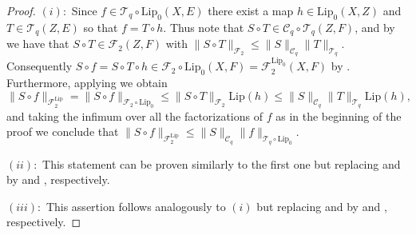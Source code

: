 \documentclass[12pt]{amsart}
\def\F{\mathcal{F}}
\def\C{\mathcal{C}}
\def\T{\mathcal{T}}
\def\C{\mathcal{C}}
\def\Lip{\mathrm{Lip}_0}
\def\Lipnorm{\mathrm{Lip}}
\begin{document}
\begin{proof}
	$(i):$ Since $f \in \T_q\circ\Lip(X,E)$ there exist a map $h\in\Lip(X,Z)$ and $T\in \T_q(Z,E)$ so that $f = T \circ h$. Thus note that $S\circ T \in \C_q \circ \T_q(Z,F)$, and by \cite[21.4.6]{Pie-80} we have that $S \circ T \in \F_2(Z,F)$ with $\|S \circ T\|_{\F_2} \leq \|S\|_{\C_q}\|T\|_{\T_q}$. Consequently $S \circ f = S \circ T \circ h \in \F_2 \circ \Lip(X,F) = \F_2^{\Lip}(X,F)$ by \cite[Proposition 2.9]{AchTia-24}. Furthermore, applying \cite[p. 828]{Saa-17} we obtain
	$$
	\|S\circ f\|_{\F_2^{\Lipnorm}} = \|S \circ f\|_{\F_2 \circ \Lip} \leq \|S \circ T\|_{\F_2}\Lipnorm(h) \leq \|S\|_{\C_q}\|T\|_{\T_q}\Lipnorm(h),
	$$
	and taking the infimum over all the factorizations of $f$ as in the beginning of the proof we conclude that $\|S \circ f\|_{\F_2^{\Lipnorm}} \leq \|S\|_{\C_q}\|f\|_{\T_q\circ \Lip}$.
	
	$(ii):$ This statement can be proven similarly to the first one but replacing \cite[21.4.6]{Pie-80} and \cite[p. 828]{Saa-17} by \cite[21.4.8]{Pie-80} and \cite[Proposition 4.5 $(i)$ and Proposition 4.8]{BelChe-18}, respectively.

	$(iii):$ This assertion follows analogously to $(i)$ but replacing \cite[21.4.6]{Pie-80} and \cite[p. 828]{Saa-17} by \cite[21.4.7]{Pie-80} and \cite[Remark 2.7]{AchRueYah-17}, respectively.
\end{proof}
\end{document}
